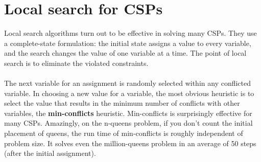 \section{Local search for CSPs}
Local search algorithms turn out to be effective in solving many CSPs. They
use a complete-state formulation: the initial state assigns a value to every variable, and the search changes the value of one variable at a time. The point of local search is to eliminate the violated constraints.\\\\
The next variable for an assignment is randomly selected within any conflicted variable. In choosing a new value for a variable, the most obvious heuristic is to select the value that results in the minimum number of conflicts with other variables, the \textbf{min-conflicts} heuristic. Min-conflicts is surprisingly effective for many CSPs. Amazingly, on the n-queens problem, if you don’t count the initial placement of queens, the run time of min-conflicts is roughly independent of problem size. It solves even the million-queens problem in an average of 50 steps (after the initial assignment).

